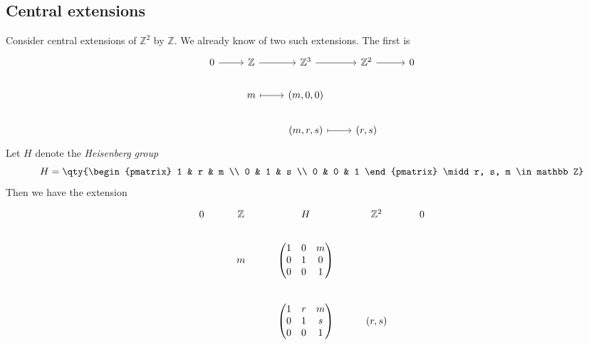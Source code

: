 \subsection{Central extensions}
\begin{example}
    Consider central extensions of \( \mathbb Z^2 \) by \( \mathbb Z \).
    We already know of two such extensions.
    The first is
\[\begin{tikzcd}
	0 & {\mathbb Z} & {\mathbb Z^3} & {\mathbb Z^2} & 0 \\
	& m & {(m, 0, 0)} \\
	&& {(m, r, s)} & {(r, s)}
	\arrow[from=1-1, to=1-2]
	\arrow[from=1-2, to=1-3]
	\arrow[from=1-3, to=1-4]
	\arrow[from=1-4, to=1-5]
	\arrow[maps to, from=2-2, to=2-3]
	\arrow[maps to, from=3-3, to=3-4]
\end{tikzcd}\]
    Let \( H \) denote the \emph{Heisenberg group}
    \[ H = \qty{\begin{pmatrix}
        1 & r & m \\
        0 & 1 & s \\
        0 & 0 & 1
    \end{pmatrix} \midd r, s, m \in mathbb Z} \]
    Then we have the extension
\[\begin{tikzcd}[ampersand replacement=\&]
	0 \& {\mathbb Z} \& H \& {\mathbb Z^2} \& 0 \\
	\& m \& {\begin{pmatrix}1&0&m\\0&1&0\\0&0&1\end{pmatrix}} \\
	\&\& {\begin{pmatrix}1&r&m\\0&1&s\\0&0&1\end{pmatrix}} \& {(r, s)}

\end{tikzcd}\]
\end{example}
